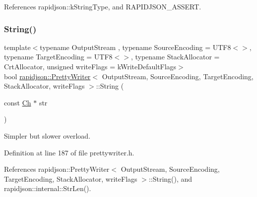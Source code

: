 References rapidjson\+::k\+String\+Type, and R\+A\+P\+I\+D\+J\+S\+O\+N\+\_\+\+A\+S\+S\+E\+RT.

\mbox{\label{classrapidjson_1_1_pretty_writer_a363c2280393e27e19bceb8d015c2832c}} 
\subsubsection{\texorpdfstring{String()}{String()}\hspace{0.1cm}{\footnotesize\ttfamily [2/2]}}
{\footnotesize\ttfamily template$<$typename Output\+Stream , typename Source\+Encoding  = U\+T\+F8$<$$>$, typename Target\+Encoding  = U\+T\+F8$<$$>$, typename Stack\+Allocator  = Crt\+Allocator, unsigned write\+Flags = k\+Write\+Default\+Flags$>$ \\
bool \mbox{\hyperlink{classrapidjson_1_1_pretty_writer}{rapidjson\+::\+Pretty\+Writer}}$<$ Output\+Stream, Source\+Encoding, Target\+Encoding, Stack\+Allocator, write\+Flags $>$\+::String (\begin{DoxyParamCaption}\item[{const \mbox{\hyperlink{classrapidjson_1_1_pretty_writer_a74a38902073aa599c8bcc6a3ca6126d0}{Ch}} $\ast$}]{str }\end{DoxyParamCaption})}



Simpler but slower overload. 



Definition at line 187 of file prettywriter.\+h.


\begin{DoxyCode}{0}

\end{DoxyCode}


References rapidjson\+::\+Pretty\+Writer$<$ Output\+Stream, Source\+Encoding, Target\+Encoding, Stack\+Allocator, write\+Flags $>$\+::\+String(), and rapidjson\+::internal\+::\+Str\+Len().



